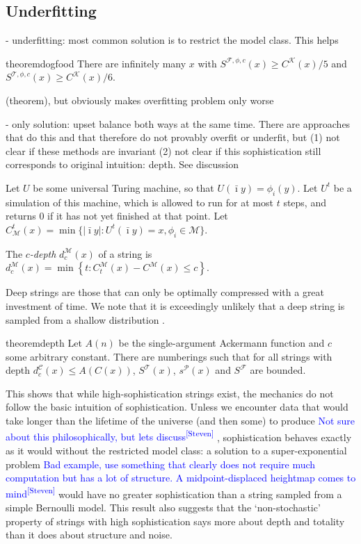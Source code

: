 \documentclass{style/llncs}
\newcommand{\M}{\mathscr M}
\newcommand{\C}{\mathscr C}
\newcommand{\T}{\mathscr T}
\newcommand{\F}{\mathscr F}
\renewcommand{\P}{\mathscr P}
\newcommand{\K}{\mathscr K}
\newcommand{\s}{S}
\newcommand{\sdr}[1]{\textcolor{blue}{\small #1\textsuperscript{[Steven]} }}
\begin{document}
\subsection{Underfitting}
- underfitting: most common solution is to restrict the model class. This helps 

\begin{restatable}{theorem}{dogfood}
There are infinitely many $x$ with $\s^{\F,\phi,c}(x) \geq C^{\K}(x)/5$ and $\s^{\T,\phi,c}(x) \geq C^{\K}(x)/6$. 
\end{restatable} 

(theorem), but obviously makes overfitting problem only worse

- only solution: upset balance both ways at the same time. There are approaches that do this and that therefore do not provably overfit or underfit, but (1) not clear if these methods are invariant (2) not clear if this sophistication still corresponds to original intuition: depth. See discussion

\begin{definition}\belowdisplayskip=-12pt
Let $U$ be some universal Turing machine, so that $U(\bar\imath y) = \phi_i(y)$. Let $U^t$ be a simulation of this machine, which is allowed to run for at most $t$ steps, and returns $0$ if it has not yet finished at that point. Let $C^t_\M(x) = \min\{|\bar\imath y| : U^t(\bar\imath y) = x, \phi_i \in \M\}$.

The \emph{$c$-depth} $d^\M_c(x)$ of a string is $d^\M_c(x) = \min \left\{t : C^\M_t(x) - C^\M(x) \leq c \right\}$.
\end{definition}

Deep strings are those that can only be optimally compressed with a great investment of time. We note that it is exceedingly unlikely that a deep string is sampled from a shallow distribution \cite{bloem2014safe,bennett1988logical}.
 
\begin{restatable}{theorem}{depth}
Let $A(n)$ be the single-argument Ackermann function and $c$ some arbitrary constant. There are numberings such that for all strings with depth $d^\C_c(x) \leq A(C(x))$, $\s^\T(x)$, $s^\P(x)$ and $\s^\F$ are bounded.
\end{restatable}
\noindent This shows that while high-sophistication strings exist, the mechanics do not follow the basic intuition of sophistication. Unless we encounter data that would take longer than the lifetime of the universe (and then some) to produce \sdr{Not sure about this philosophically, but lets discuss}, sophistication behaves exactly as it would without the restricted model class: a solution to a super-exponential problem \sdr{Bad example, use something that clearly does not require much computation but has a lot of structure. A midpoint-displaced heightmap comes to mind} would have no greater sophistication than a string sampled from a simple Bernoulli model. This result also suggests that the `non-stochastic' property of strings with high sophistication\cite{shen1983concept,vereshchagin2004kolmogorov} says more about depth and totality than it does about structure and noise.
\end{document}
